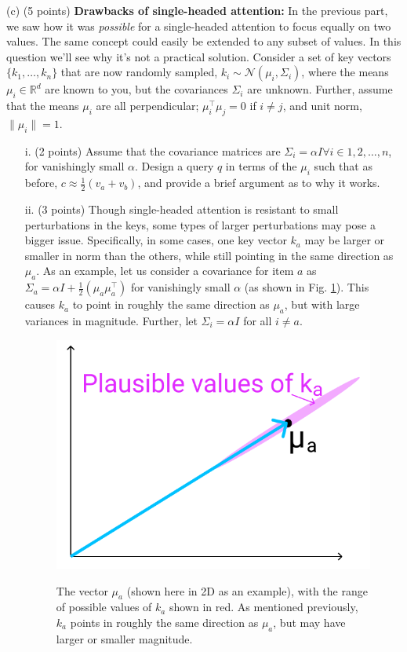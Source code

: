 \documentclass[letterpaper,12pt]{article}
\begin{document}
	\noindent(c) (5 points) \textbf{Drawbacks of single-headed attention:} In the previous part, we saw how it was \textit{possible} for a single-headed attention to focus equally on two values. The same concept could easily be extended to any subset of values. In this question we’ll see why it’s not a practical solution. Consider a set of key vectors $\{k_1, \ldots , k_n\}$ that are now randomly sampled, $k_i \sim \mathcal{N}(μ_i,\Sigma_i)$, where the means $μ_i \in \mathbb{R}^d$ are known to you, but the covariances $\Sigma_i$ are unknown. Further, assume that the means $μ_i$ are all perpendicular; $\mu^\top_i \mu_j = 0$ if $i \neq j$, and unit norm, $\|\mu_i\| = 1$.
	
	\begin{itemize}
	\item[i.]
	(2 points) Assume that the covariance matrices are $\Sigma_i = \alpha I \forall i \in {1, 2, \ldots , n}$, for vanishingly small $\alpha$. Design a query $q$ in terms of the $\mu_i$ such that as before, $c \approx \frac{1}{2}(v_a +v_b)$, and provide a brief argument as to why it works.
		
	\item[ii.]
	(3 points) Though single-headed attention is resistant to small perturbations in the keys, some types of larger perturbations may pose a bigger issue. Specifically, in some cases, one key vector $k_a$ may be larger or smaller in norm than the others, while still pointing in the same direction as $\mu_a$. As an example, let us consider a covariance for item $a$ as $\Sigma_a = \alpha I+ \frac{1}{2}(\mu_a\mu^\top_a )$ for vanishingly small $\alpha$ (as shown in Fig. \ref{fig: vector}). This causes $k_a$ to point in roughly the same direction as $\mu_a$, but with large variances in magnitude. Further, let $\Sigma_i = \alpha I$ for all $i \neq a$.
		
	\begin{figure}[htbp] 
		\centering 
		\includegraphics[width=0.5\linewidth]{ka_plausible}
		\captionsetup{font=small}
		\label{vector}
		\caption{
			\label{fig: vector} %
			The vector $\mu_a$ (shown here in 2D as an example), with the range of possible values of $k_a$ shown in red. As mentioned previously, $k_a$ points in roughly the same direction as $\mu_a$, but may have larger or smaller magnitude.
		}
	\end{figure}
		

\end{itemize}
\end{document}
